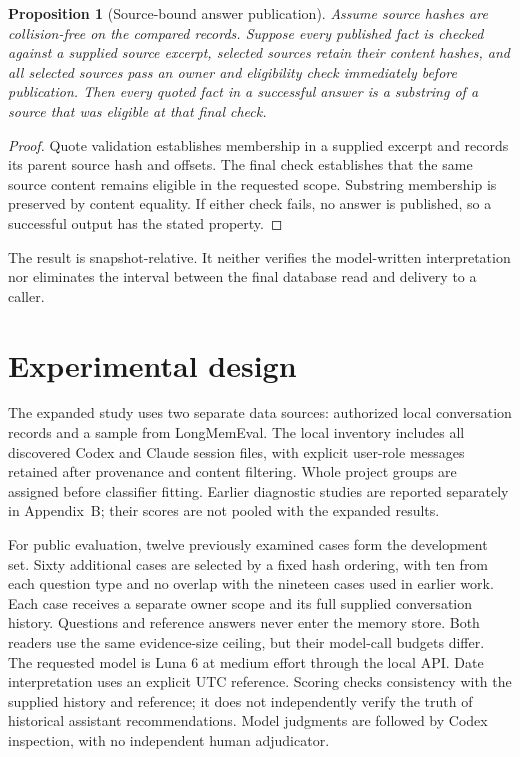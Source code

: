 \documentclass[11pt]{article}
\newtheorem{proposition}[theorem]{Proposition}
\begin{document}
\begin{proposition}[Source-bound answer publication]
Assume source hashes are collision-free on the compared records. Suppose every published fact is checked against a supplied source excerpt, selected sources retain their content hashes, and all selected sources pass an owner and eligibility check immediately before publication. Then every quoted fact in a successful answer is a substring of a source that was eligible at that final check.
\end{proposition}
\begin{proof}
Quote validation establishes membership in a supplied excerpt and records its parent source hash and offsets. The final check establishes that the same source content remains eligible in the requested scope. Substring membership is preserved by content equality. If either check fails, no answer is published, so a successful output has the stated property.
\end{proof}
The result is snapshot-relative. It neither verifies the model-written interpretation nor eliminates the interval between the final database read and delivery to a caller.

\section{Experimental design}
The expanded study uses two separate data sources: authorized local conversation records and a sample from LongMemEval. The local inventory includes all discovered Codex and Claude session files, with explicit user-role messages retained after provenance and content filtering. Whole project groups are assigned before classifier fitting. Earlier diagnostic studies are reported separately in Appendix~B; their scores are not pooled with the expanded results.

For public evaluation, twelve previously examined cases form the development set. Sixty additional cases are selected by a fixed hash ordering, with ten from each question type and no overlap with the nineteen cases used in earlier work. Each case receives a separate owner scope and its full supplied conversation history. Questions and reference answers never enter the memory store. Both readers use the same evidence-size ceiling, but their model-call budgets differ. The requested model is Luna 6 at medium effort through the local API. Date interpretation uses an explicit UTC reference. Scoring checks consistency with the supplied history and reference; it does not independently verify the truth of historical assistant recommendations. Model judgments are followed by Codex inspection, with no independent human adjudicator.
\end{document}
